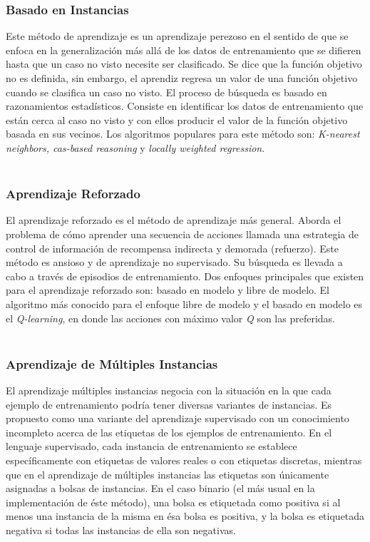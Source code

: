 	\subsubsection{Basado en Instancias}

	Este método de aprendizaje es un aprendizaje perezoso en el sentido de que se enfoca en la generalización más allá de los datos de  entrenamiento que se difieren hasta que un caso no visto necesite ser clasificado. Se dice que la función objetivo no es definida, sin embargo, el aprendiz regresa un valor de una función objetivo cuando se clasifica un caso no visto. El proceso de búsqueda es basado en razonamientos estadísticos. Consiste en identificar los datos de entrenamiento que están cerca al caso no visto y con ellos producir el valor de la función objetivo basada en sus vecinos. Los algoritmos populares para este método son: \textit{K-nearest neighbors, cas-based reasoning} y \textit{locally weighted regression}.\\ \\
	

	\subsubsection{Aprendizaje Reforzado}

	El aprendizaje reforzado es el método de aprendizaje más general. Aborda el problema de cómo aprender una secuencia de acciones llamada una estrategia de control de información de recompensa indirecta y demorada (refuerzo). Este método es ansioso y de aprendizaje no supervisado. Su búsqueda es llevada a cabo a través de episodios de entrenamiento. Dos enfoques principales que existen para el aprendizaje reforzado son: basado en modelo y libre de modelo. El algoritmo más conocido para el enfoque libre de modelo y el basado en modelo es el \textit{Q-learning}, en donde las acciones con máximo valor \textit{Q} son las preferidas.\\ \\
	

	\subsubsection{Aprendizaje de Múltiples Instancias}

	El aprendizaje múltiples instancias negocia con la situación en la que cada ejemplo de entrenamiento podría tener diversas variantes de instancias. Es propuesto como una variante del aprendizaje supervisado con un conocimiento incompleto acerca de las etiquetas de los ejemplos de entrenamiento. En el lenguaje supervisado, cada instancia de entrenamiento se establece específicamente con etiquetas de valores reales o con etiquetas discretas, mientras que en el aprendizaje de múltiples instancias las etiquetas son únicamente asignadas a bolsas de instancias. En el caso binario (el más usual en la implementación de éste método), una bolsa es etiquetada como positiva si al menos una instancia de la misma en ésa bolsa es positiva, y la bolsa es etiquetada negativa si todas las instancias de ella son negativas.\\ \\
	

